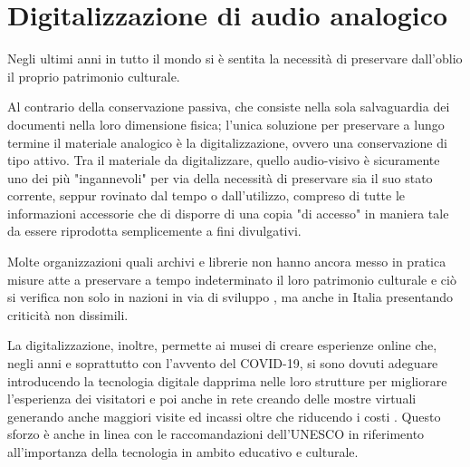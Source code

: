 
\chapter{Digitalizzazione di audio analogico}
\label{chp:digitalizzazione}


Negli ultimi anni in tutto il mondo si è sentita la necessità di preservare dall'oblio il proprio patrimonio culturale.

Al contrario della conservazione passiva, che consiste nella sola salvaguardia dei documenti nella loro dimensione fisica; l'unica soluzione per preservare a lungo termine il materiale analogico è la digitalizzazione, ovvero una conservazione di tipo attivo.
Tra il materiale da digitalizzare, quello audio-visivo è sicuramente uno dei più "ingannevoli" per via della necessità di preservare sia il suo stato corrente, seppur rovinato dal tempo o dall'utilizzo, compreso di tutte le informazioni accessorie che di disporre di una copia "di accesso" in maniera tale da essere riprodotta semplicemente a fini divulgativi.

Molte organizzazioni quali archivi e librerie non hanno ancora messo in pratica misure atte a preservare a tempo indeterminato il loro patrimonio culturale e ciò si verifica non solo in nazioni in via di sviluppo \cite{rakemaneChallengesManagingPreserving2021}, ma anche in Italia \cite{raimoDigitalizationCulturalIndustry2022} presentando criticità non dissimili. %

La digitalizzazione, inoltre, permette ai musei di creare esperienze online che, negli anni e soprattutto con l'avvento del COVID-19, si sono dovuti adeguare introducendo la tecnologia digitale dapprima nelle loro strutture per migliorare l'esperienza dei visitatori e poi anche in rete creando delle mostre virtuali generando anche maggiori visite ed incassi oltre che riducendo i costi \cite{raimoDigitalizationCulturalIndustry2022}. %
Questo sforzo è anche in linea con le raccomandazioni dell'UNESCO \cite{unescoRecommendationConcerningProtection} in riferimento all'importanza della tecnologia in ambito educativo e culturale.


